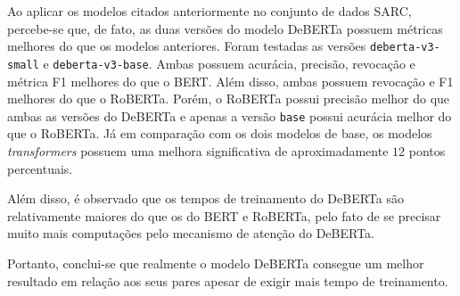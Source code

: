 Ao aplicar os modelos citados anteriormente no conjunto de dados SARC,
percebe-se que, de fato, as duas versões do modelo DeBERTa possuem métricas
melhores do que os modelos anteriores. Foram testadas as versões
\texttt{deberta-v3-small} e \texttt{deberta-v3-base}. Ambas possuem acurácia,
precisão, revocação e métrica F1 melhores do que o BERT. Além disso, ambas
possuem revocação e F1 melhores do que o RoBERTa. Porém, o RoBERTa possui
precisão melhor do que ambas as versões do DeBERTa e apenas a versão
\texttt{base} possui acurácia melhor do que o RoBERTa. Já em comparação com os
dois modelos de base, os modelos \textit{transformers} possuem uma melhora
significativa de aproximadamente $12$ pontos percentuais.

Além disso, é observado que os tempos de treinamento do DeBERTa são relativamente
maiores do que os do BERT e RoBERTa, pelo fato de se precisar muito mais
computações pelo mecanismo de atenção do DeBERTa.

Portanto, conclui-se que realmente o modelo DeBERTa consegue um melhor resultado
em relação aos seus pares apesar de exigir mais tempo de treinamento.

